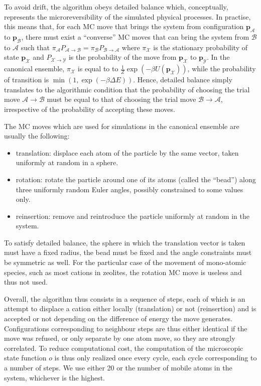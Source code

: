 \documentclass[main.tex]{subfiles}
\begin{document}
To avoid drift, the algorithm obeys detailed balance which, conceptually, represents the microreversibility of the simulated physical processes. In practise, this means that, for each MC move that brings the system from configuration ${\boldsymbol p}_\mathcal{A}$ to ${\boldsymbol p}_\mathcal{B}$, there must exist a ``converse'' MC moves that can bring the system from $\mathcal{B}$ to $\mathcal{A}$ such that $\pi_\mathcal{A} P_{\mathcal{A}\to \mathcal{B}} = \pi_\mathcal{B} P_{\mathcal{B}\to \mathcal{A}}$ where $\pi_\mathcal{X}$ is the stationary probability of state ${\boldsymbol p}_\mathcal{X}$ and $P_{\mathcal{X}\to \mathcal{Y}}$ is the probability of the move from ${\boldsymbol p}_\mathcal{X}$ to ${\boldsymbol p}_\mathcal{Y}$. In the canonical ensemble, $\pi_\mathcal{X}$ is equal to to $\frac1Z\exp\left(-\beta U\left({\boldsymbol p}_\mathcal{X}\right)\right)$, while the probability of transition is $\min\left(1, \exp\left(-\beta \Delta E\right)\right)$. Hence, detailed balance simply translates to the algorithmic condition that the probability of choosing the trial move $\mathcal{A}\to \mathcal{B}$ must be equal to that of choosing the trial move $\mathcal{B}\to \mathcal{A}$, irrespective of the probability of accepting these moves.

The MC moves which are used for simulations in the canonical ensemble are usually the following:
\begin{itemize}
    \item translation: displace each atom of the particle by the same vector, taken uniformly at random in a sphere.
    \item rotation: rotate the particle around one of its atoms (called the ``bead'') along three uniformly random Euler angles, possibly constrained to some values only.
    \item reinsertion: remove and reintroduce the particle uniformly at random in the system.
\end{itemize}
To satisfy detailed balance, the sphere in which the translation vector is taken must have a fixed radius, the bead must be fixed and the angle constraints must be symmetric as well. For the particular case of the movement of mono-atomic species, such as most cations in zeolites, the rotation MC move is useless and thus not used.

Overall, the algorithm thus consists in a sequence of steps, each of which is an attempt to displace a cation either locally (translation) or not (reinsertion) and is accepted or not depending on the difference of energy the move generates. Configurations corresponding to neighbour steps are thus either identical if the move was refused, or only separate by one atom move, so they are strongly correlated. To reduce computational cost, the computation of the microscopic state function $o$ is thus only realized once every cycle, each cycle corresponding to a number of steps. We use either 20 or the number of mobile atoms in the system, whichever is the highest.
\end{document}
